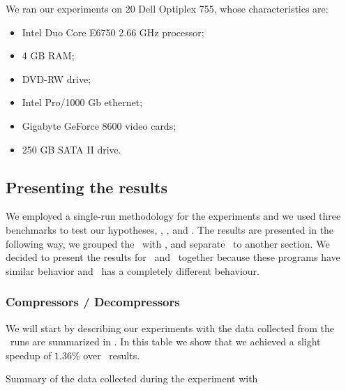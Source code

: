 
We ran our experiments on $20$ Dell Optiplex 755, whose characteristics are:
\begin{itemize}

\item Intel Duo Core E6750 2.66 GHz processor;

\item 4 GB RAM;

\item DVD-RW drive;

\item Intel Pro/1000 Gb ethernet;

\item Gigabyte GeForce 8600 video cards;

\item 250 GB SATA II drive. 

\end{itemize}


\subsection{Presenting the results}

We employed a single-run methodology for the experiments and we used three benchmarks to test our hypotheses, \bzip, \gzip, and \gcc. The results are presented in the following way, we grouped the \bzip\ with \gzip, and separate \gcc\ to another section. We decided to present the results for \bzip\ and \gzip\ together because these programs have similar behavior and \gcc\ has a completely different behaviour.

\subsubsection{Compressors / Decompressors}

We will start by describing our experiments with the data collected from the \bzip\ runs are summarized in . In this table we show that we achieved a slight speedup of $1.36 \%$ over \llvm\ results.

\begin{table}
  \centering
  \begin{tiny}
  
  \end{tiny}
  \caption{Summary of the data collected during the experiment with \bzip}
  \label{tab:speedupb}
\end{table}

